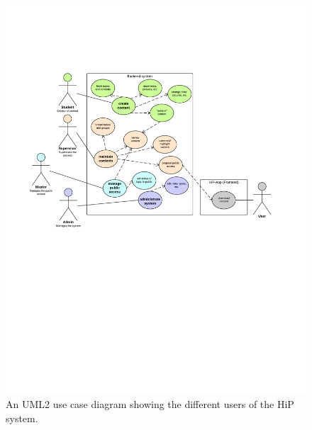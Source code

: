 \begin{figure}[ht]
\centerline{\includegraphics[width=1.4\textwidth]{gfx/HiP-UseCase_Diagramm}}
\caption{An \ac{UML2} use case diagram showing the different users of the \ac{HiP} system.}
\label{usecase}
\end{figure}

